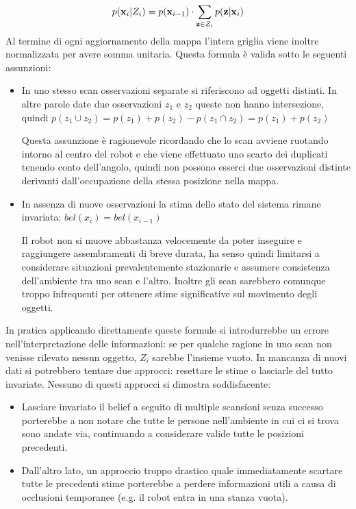 \documentclass[a4paper]{article}
\begin{document}
	\begin{equation}\label{eq:belief-update}
		p({\bf x}_i | Z_i) = p({\bf x}_{i-1}) \cdot 
		\sum_{{\bf z} \in Z_i} p({\bf z} | {\bf x}_i)
	\end{equation}
	Al termine di ogni aggiornamento della mappa l'intera griglia viene inoltre
	normalizzata per avere somma unitaria.  
	Questa formula è valida sotto le seguenti assunzioni:
	\begin{itemize}
		\item In uno stesso scan osservazioni separate si riferiscono ad
			oggetti distinti. In altre parole date due osservazioni $z_1$ e
			$z_2$ queste non hanno intersezione, quindi $ p(z_1 \cup z_2) =
			p(z_1)+p(z_2)-p( z_1 \cap z_2) = p(z_1)+p(z_2) $ 

			Questa assunzione è ragionevole ricordando che lo scan avviene
			ruotando intorno al centro del robot e che viene effettuato uno
			scarto dei duplicati tenendo conto dell'angolo, quindi non possono
			esserci due osservazioni distinte derivanti dall'occupazione della
			stessa posizione nella mappa.

		\item In assenza di nuove osservazioni la stima dello stato del sistema
			rimane invariata: $ \overline{bel}(x_i) = bel(x_{i-1}) $ 

			Il robot non si muove abbastanza velocemente da poter inseguire e
			raggiungere assembramenti di breve durata, ha senso quindi
			limitarsi a considerare situazioni prevalentemente stazionarie e
			assumere consistenza dell'ambiente tra uno scan e l'altro. Inoltre
			gli scan sarebbero comunque troppo infrequenti per ottenere stime
			significative sul movimento degli oggetti.

	\end{itemize}

	In pratica applicando direttamente queste formule si introdurrebbe un
	errore nell'interpretazione delle informazioni: se per qualche ragione in
	uno scan non venisse rilevato nessun oggetto, $ Z_i $ sarebbe l'insieme
	vuoto. In mancanza di nuovi dati si potrebbero tentare due approcci:
	resettare le stime o lasciarle del tutto invariate. Nessuno di questi
	approcci si dimostra soddisfacente:
	\begin{itemize} 
		\item Lasciare invariato il belief a seguito di multiple scansioni
			senza successo porterebbe a non notare che tutte le persone
			nell'ambiente in cui ci si trova sono andate via, continuando a
			considerare valide tutte le posizioni precedenti.
		\item Dall'altro lato, un approccio troppo drastico quale
			immediatamente scartare tutte le precedenti stime porterebbe a
			perdere informazioni utili a causa di occlusioni temporanee (e.g.
			il robot entra in una stanza vuota).
	\end{itemize}
\end{document}
